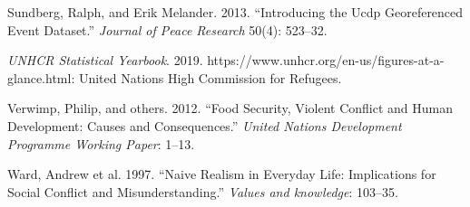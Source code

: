 \documentclass[11pt]{article}
\begin{document}
\leavevmode\hypertarget{ref-ucdp}{}%
Sundberg, Ralph, and Erik Melander. 2013. ``Introducing the Ucdp
Georeferenced Event Dataset.'' \emph{Journal of Peace Research} 50(4):
523--32.

\leavevmode\hypertarget{ref-unhcr2019}{}%
\emph{UNHCR Statistical Yearbook}. 2019.
https://www.unhcr.org/en-us/figures-at-a-glance.html: United Nations
High Commission for Refugees.

\leavevmode\hypertarget{ref-verwimp2012food}{}%
Verwimp, Philip, and others. 2012. ``Food Security, Violent Conflict and
Human Development: Causes and Consequences.'' \emph{United Nations
Development Programme Working Paper}: 1--13.

\leavevmode\hypertarget{ref-ward1997naive}{}%
Ward, Andrew et al. 1997. ``Naive Realism in Everyday Life: Implications
for Social Conflict and Misunderstanding.'' \emph{Values and knowledge}:
103--35.
\end{document}
